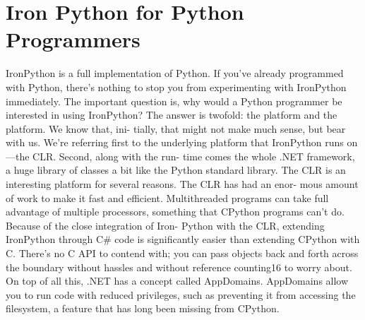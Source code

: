 \documentclass[12pt,a4paper,final,twoside,titlepage]{book}
\begin{document}
\section{Iron Python for Python Programmers}
IronPython is a full implementation of Python. If you’ve already programmed with Python, there’s nothing to stop you from experimenting with IronPython immediately. The important question is, why would a Python programmer be interested in using IronPython? The answer is twofold: the platform and the platform. We know that, ini- tially, that might not make much sense, but bear with us. We’re referring first to the underlying platform that IronPython runs on—the CLR. Second, along with the run- time comes the whole .NET framework, a huge library of classes a bit like the Python standard library. The CLR is an interesting platform for several reasons. The CLR has had an enor- mous amount of work to make it fast and efficient. Multithreaded programs can take full advantage of multiple processors, something that CPython programs can’t do. Because of the close integration of Iron- Python with the CLR, extending IronPython through C\# code is significantly easier than extending CPython with C. There’s no C API to contend with; you can pass objects back and forth across the boundary without hassles and without reference counting16 to worry about. On top of all this, .NET has a concept called AppDomains. AppDomains allow you to run code with reduced privileges, such as preventing it from accessing the filesystem, a feature that has long been missing from CPython.
\end{document}
